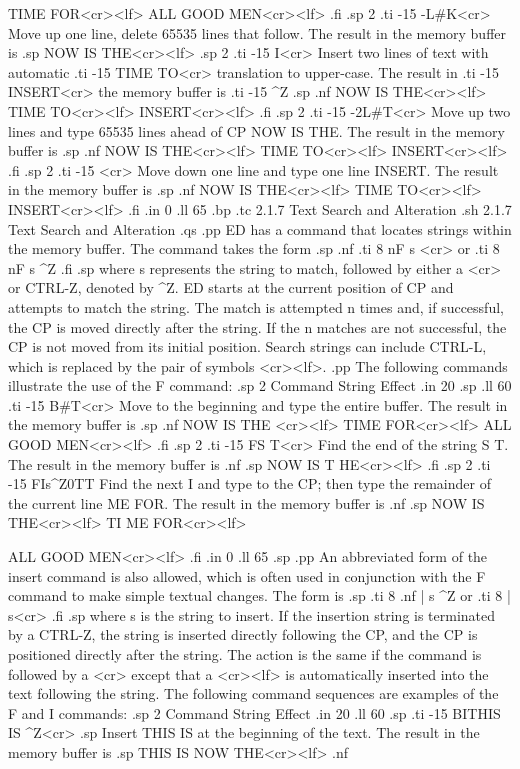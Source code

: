 TIME FOR<cr><lf>
ALL GOOD MEN<cr><lf>
.fi
.sp 2 
.ti -15
-L#K<cr>       Move up one line, delete 65535 lines that follow.  The result 
in the memory buffer is
.sp
NOW IS THE<cr><lf>
.sp 2
.ti -15
I<cr>          Insert two  lines of text with  automatic
.ti -15        
TIME TO<cr>    translation to upper-case.  The result in
.ti -15
INSERT<cr>     the memory buffer is 
.ti -15
^Z            
.sp
.nf               
NOW IS THE<cr><lf>  
TIME TO<cr><lf>     
INSERT<cr><lf>      
.fi
.sp 2
.ti -15
-2L#T<cr>      Move up two lines and type 65535 lines ahead of CP NOW IS THE.  
The result in the memory buffer is    
.sp
.nf                
NOW IS THE<cr><lf>   
TIME TO<cr><lf>      
INSERT<cr><lf>       
.fi
.sp 2
.ti -15
<cr>           Move down one line and type one line INSERT.  The result in 
the memory buffer is
.sp
.nf 
NOW IS THE<cr><lf>   
TIME TO<cr><lf>      
INSERT<cr><lf>       
.fi
.in 0
.ll 65
.bp 
.tc         2.1.7  Text Search and Alteration
.sh
2.1.7  Text Search and Alteration
.qs
.pp
ED has a command that locates strings within the memory 
buffer.  The command takes the form
.sp
.nf
.ti 8
nF s <cr>
or
.ti 8 
nF s ^Z
.fi
.sp
where s represents the string to match, followed by either a <cr> 
or CTRL-Z, denoted by ^Z.  ED starts at the current position 
of CP and attempts to match the string.  The match is attempted n 
times and, if successful, the CP is moved directly after the 
string.  If the n matches are not successful, the CP is not moved 
from its initial position.  Search strings can include CTRL-L, 
which is replaced by the pair of symbols <cr><lf>.
.pp
The following commands illustrate the use of the F command:
.sp 2
  Command String                      Effect           
.in 20
.sp
.ll 60
.ti -15
B#T<cr>        Move to the beginning and type the entire buffer.  The result
in the memory buffer is
.sp
.nf      
NOW IS THE <cr><lf>   
TIME FOR<cr><lf>      
ALL GOOD MEN<cr><lf>  
.fi
.sp 2
.ti -15
FS T<cr>       Find the end of the string S T.  The result in the memory
buffer is
.nf
.sp    
NOW IS T  HE<cr><lf>
.fi
.sp 2
.ti -15
FIs^Z0TT       Find the next I and type to the CP; then type the remainder  
of the current line ME FOR.  The result in the memory buffer is
.nf
.sp
NOW IS THE<cr><lf>     
TI  ME FOR<cr><lf>     
                       
ALL GOOD MEN<cr><lf>   
.fi
.in 0
.ll 65
.sp 
.pp
An abbreviated form of the insert command is also allowed, which 
is often used in conjunction with the F command to make simple 
textual changes.  The form is
.sp
.ti 8
.nf
| s ^Z
or
.ti 8
| s<cr>
.fi
.sp
where s is the string to insert.  If the insertion string is 
terminated by a CTRL-Z, the string is inserted directly following 
the CP, and the CP is positioned directly after the string.  The 
action is the same if the command is followed by a <cr> except 
that a <cr><lf> is automatically inserted into the text following 
the string.  The following command sequences are examples 
of the F and I commands:
.sp 2
  Command String                      Effect              
.in 20
.ll 60
.sp
.ti -15
BITHIS IS ^Z<cr>        
.sp
Insert THIS IS at the beginning of the text.  The result in the
memory buffer is          
.sp                                                
THIS IS  NOW THE<cr><lf>   
.nf
                           
